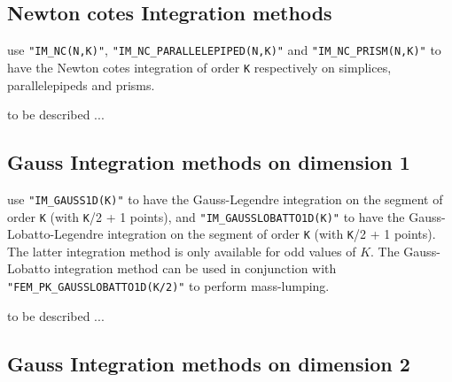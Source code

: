 \documentclass[11pt,a4paper]{article}
\begin{document}
\subsection{Newton cotes Integration methods}

use {\tt "IM\_NC(N,K)"}, {\tt "IM\_NC\_PARALLELEPIPED(N,K)"}
and {\tt "IM\_NC\_PRISM(N,K)"} to have the Newton cotes integration of order {\tt K} respectively on simplices, parallelepipeds and prisms.


to be described ...


\subsection{Gauss Integration methods on dimension 1}

use {\tt "IM\_GAUSS1D(K)"} to have the Gauss-Legendre integration on the segment of order {\tt K} (with {\tt K}/2 + 1 points), and {\tt "IM\_GAUSSLOBATTO1D(K)"} to have the Gauss-Lobatto-Legendre integration on the segment of order {\tt K} (with {\tt K}/2 + 1 points). The latter integration method is only available for odd values of $K$. The Gauss-Lobatto integration method can be used in conjunction with {\tt "FEM\_PK\_GAUSSLOBATTO1D(K/2)"} to perform mass-lumping.

to be described ...

\subsection{Gauss Integration methods on dimension 2}
\end{document}
